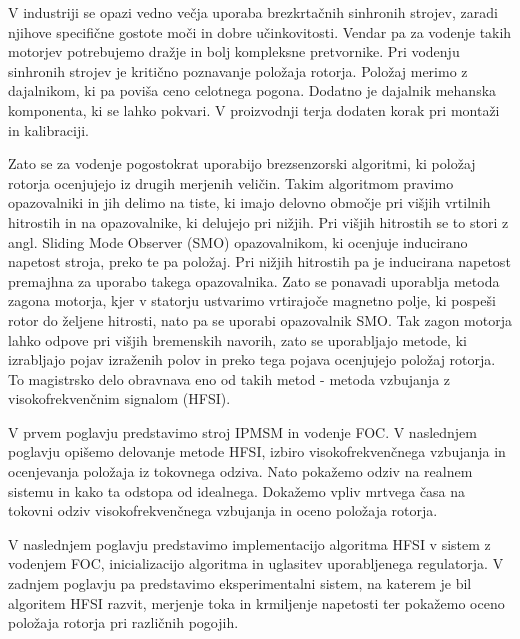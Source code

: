 \documentclass[a4paper,twoside,openright,12pt,slovene]{book}
\begin{document}
V industriji se opazi vedno večja uporaba brezkrtačnih sinhronih strojev, zaradi njihove specifične gostote moči in dobre učinkovitosti. Vendar pa za vodenje takih motorjev potrebujemo dražje in bolj
kompleksne pretvornike. Pri vodenju sinhronih strojev je kritično poznavanje položaja rotorja. Položaj merimo z dajalnikom, ki pa poviša ceno celotnega pogona. Dodatno je dajalnik mehanska komponenta,
ki se lahko pokvari. V proizvodnji terja dodaten korak pri montaži in kalibraciji.

Zato se za vodenje pogostokrat uporabijo brezsenzorski algoritmi, ki položaj rotorja ocenjujejo iz drugih merjenih veličin. Takim algoritmom pravimo opazovalniki in jih delimo na tiste, ki imajo
delovno območje pri višjih vrtilnih hitrostih in na opazovalnike, ki delujejo pri nižjih. Pri višjih hitrostih se to stori z angl. Sliding Mode Observer (SMO) opazovalnikom, ki ocenjuje inducirano
napetost stroja, preko te pa položaj. Pri nižjih hitrostih pa je inducirana napetost premajhna za uporabo takega opazovalnika. Zato se ponavadi uporablja metoda zagona motorja, kjer v statorju
ustvarimo vrtirajoče magnetno polje, ki pospeši rotor do željene hitrosti, nato pa se uporabi opazovalnik SMO. Tak zagon motorja lahko odpove pri višjih bremenskih navorih, zato se uporabljajo metode,
ki izrabljajo pojav izraženih polov in preko tega pojava ocenjujejo položaj rotorja. To magistrsko delo obravnava eno od takih metod - metoda vzbujanja z visokofrekvenčnim signalom (HFSI).

V prvem poglavju predstavimo stroj IPMSM in vodenje FOC. V naslednjem poglavju opišemo delovanje metode HFSI, izbiro visokofrekvenčnega vzbujanja in ocenjevanja položaja iz tokovnega odziva. Nato
pokažemo odziv na realnem sistemu in kako ta odstopa od idealnega. Dokažemo vpliv mrtvega časa na tokovni odziv visokofrekvenčnega vzbujanja in oceno položaja rotorja.

V naslednjem poglavju predstavimo implementacijo algoritma HFSI v sistem z vodenjem FOC, inicializacijo algoritma in uglasitev uporabljenega regulatorja. V zadnjem poglavju pa predstavimo
eksperimentalni sistem, na katerem je bil algoritem HFSI razvit, merjenje toka in krmiljenje napetosti ter pokažemo oceno položaja rotorja pri različnih pogojih.


\end{document}
